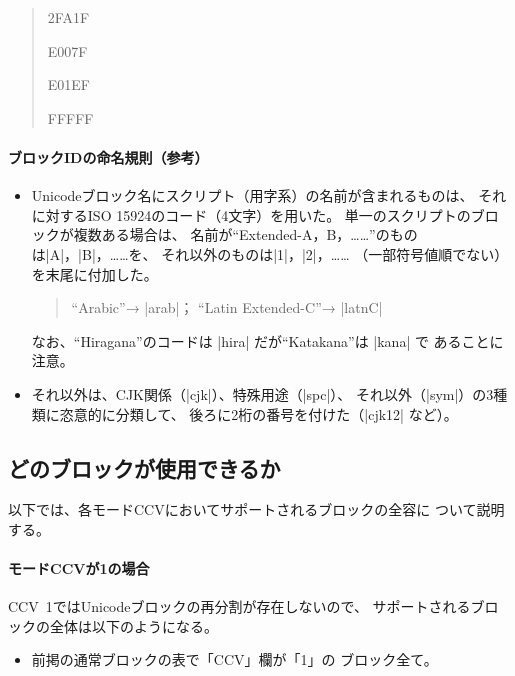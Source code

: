 \documentclass[uplatex,dvipdfmx,a4paper]{jsarticle}
\begin{document}
\begin{quote}
   {2FA1F} \par
{}   {E007F} \par
{}   {E01EF} \par
{}   {FFFFF} \par
{}   \par
\end{quote}

\paragraph{ブロックIDの命名規則\<（参考）}
\mbox{}
\begin{itemize}
\item Unicodeブロック名にスクリプト（用字系）の名前が含まれるものは、
  それに対するISO 15924のコード（4文字）を用いた。
  単一のスクリプトのブロックが複数ある場合は、
  名前が“Extended-A，B，……”のものは|A|，|B|，……を、
  それ以外のものは|1|，|2|，……
  （一部符号値順でない）を末尾に付加した。
  \begin{quote}
  “Arabic”→ |arab|； “Latin Extended-C”→ |latnC|
  \end{quote}
  なお、“Hiragana”のコードは |hira| だが“Katakana”は |kana| で
  あることに注意。
\item それ以外は、CJK関係（|cjk|）、特殊用途（|spc|）、
  それ以外（|sym|）の3種類に恣意的に分類して、
  後ろに2桁の番号を付けた（|cjk12| など）。
\end{itemize}

\subsection{どのブロックが使用できるか}

以下では、各モードCCVにおいてサポートされるブロックの全容に
ついて説明する。

\paragraph{モードCCVが1の場合}
CCV~1ではUnicodeブロックの再分割が存在しないので、
サポートされるブロックの全体は以下のようになる。

\begin{itemize}
\item 前掲の通常ブロックの表で「CCV」欄が「1」の
  ブロック全て。
\end{itemize}
\end{document}

